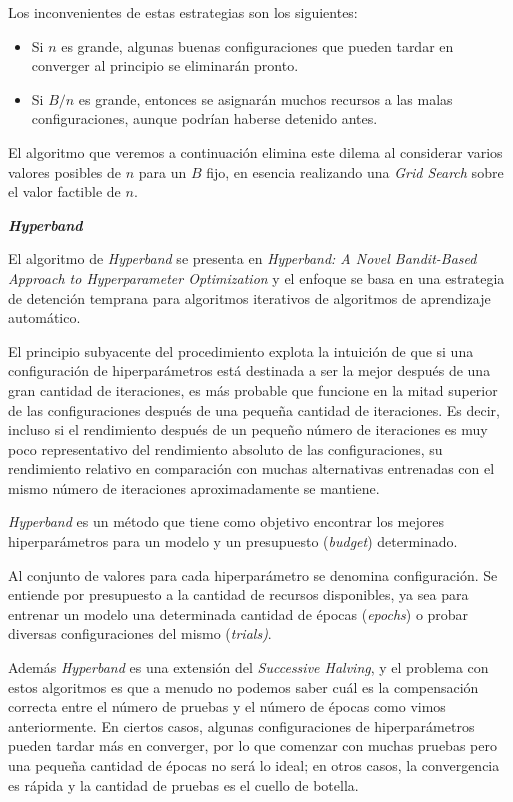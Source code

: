 \documentclass[a4paper,12pt]{article}
\begin{document}
Los inconvenientes de estas estrategias son los siguientes:
\begin{itemize}
	\item Si $n$ es grande, algunas buenas configuraciones que pueden tardar en converger al principio se eliminarán pronto.
	\item Si $B/n$ es grande, entonces se asignarán muchos recursos a las malas configuraciones, aunque podrían haberse detenido antes.
\end{itemize}

El algoritmo que veremos a continuación elimina este dilema al considerar varios valores posibles de $n$ para un $B$ fijo, en esencia realizando una \textit{Grid Search} sobre el valor factible de $n$.

\hfill

\textbf{\textit{Hyperband}} \label{hyperband}

El algoritmo de \textit{Hyperband} se presenta en \textit{ Hyperband: A Novel Bandit-Based Approach to Hyperparameter Optimization} \citep{li2018hyperband} y el enfoque se basa en una estrategia de detención temprana para algoritmos iterativos de algoritmos de aprendizaje automático.

El principio subyacente del procedimiento explota la intuición de que si una configuración de hiperparámetros está destinada a ser la mejor después de una gran cantidad de iteraciones, es más probable que funcione en la mitad superior de las configuraciones después de una pequeña cantidad de iteraciones. Es decir, incluso si el rendimiento después de un pequeño número de iteraciones es muy poco representativo del rendimiento absoluto de las configuraciones, su rendimiento relativo en comparación con muchas alternativas entrenadas con el mismo número de iteraciones aproximadamente se mantiene.

\textit{Hyperband} es un método que tiene como objetivo encontrar los mejores hiperparámetros para un modelo y un presupuesto (\textit{budget}) determinado. 

Al conjunto de valores para cada hiperparámetro se denomina configuración. Se entiende por presupuesto a la cantidad de recursos disponibles, ya sea para entrenar un modelo una determinada cantidad de épocas (\textit{epochs}) o probar diversas configuraciones del mismo (\textit{trials)}. 

Además \textit{Hyperband} es una extensión del \textit{Successive Halving}, y el problema con estos algoritmos es que a menudo no podemos saber cuál es la compensación correcta entre el número de pruebas y el número de épocas como vimos anteriormente. En ciertos casos, algunas configuraciones de hiperparámetros pueden tardar más en converger, por lo que comenzar con muchas pruebas pero una pequeña cantidad de épocas no será lo ideal; en otros casos, la convergencia es rápida y la cantidad de pruebas es el cuello de botella. \citep{Rosenberg2020Aug}
\end{document}
